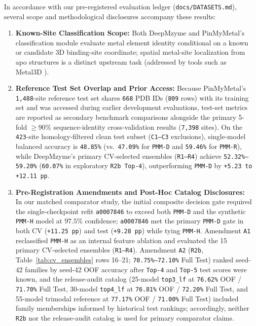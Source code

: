 \documentclass[10pt,a4paper,twocolumn]{article}
\begin{document}
In accordance with our pre-registered evaluation ledger (\texttt{docs/DATASETS.md}), several scope and methodological disclosures accompany these results:
\begin{enumerate}
  \item \textbf{Known-Site Classification Scope:} Both DeepMzyme and PinMyMetal's classification module evaluate metal element identity conditional on a known or candidate 3D binding-site coordinate; spatial metal-site localization from apo structures is a distinct upstream task (addressed by tools such as Metal3D \cite{durr2023metal3d}).
  \item \textbf{Reference Test Set Overlap and Prior Access:} Because PinMyMetal's \texttt{1,488}-site reference test set shares \texttt{668} PDB IDs (\texttt{809} rows) with its training set and was accessed during earlier development evaluations, test-set metrics are reported as secondary benchmark comparisons alongside the primary 5-fold $\ge 90\%$ sequence-identity cross-validation results (\texttt{7,398} sites). On the \texttt{423}-site homology-filtered clean test subset (\texttt{C1--C3} exclusions), single-model balanced accuracy is \texttt{48.85\%} (vs.\ \texttt{47.09\%} for \texttt{PMM-D} and \texttt{59.46\%} for \texttt{PMM-R}), while DeepMzyme's primary CV-selected ensembles (\texttt{R1--R4}) achieve \texttt{52.32\%--59.20\%} (\texttt{60.07\%} in exploratory \texttt{R2b Top-4}), outperforming \texttt{PMM-D} by \texttt{+5.23 to +12.11 pp}.
  \item \textbf{Pre-Registration Amendments and Post-Hoc Catalog Disclosures:} In our matched comparator study, the initial composite decision gate required the single-checkpoint refit \texttt{a0007846} to exceed both \texttt{PMM-D} and the synthetic \texttt{PMM-H} model at $97.5\%$ confidence; \texttt{a0007846} met the primary \texttt{PMM-D} gate in both CV (\texttt{+11.25 pp}) and test (\texttt{+9.28 pp}) while tying \texttt{PMM-H}. Amendment \texttt{A1} reclassified \texttt{PMM-H} as an internal feature ablation and evaluated the 15 primary CV-selected ensembles (\texttt{R1--R4}). Amendment \texttt{A2} (\texttt{R2b}, Table~\ref{tab:cv_ensembles} rows 16--21; \texttt{70.75\%--72.10\%} Full Test) ranked seed-42 families by seed-42 OOF accuracy after \texttt{Top-4} and \texttt{Top-5} test scores were known, and the release-audit catalog (25-model \texttt{top3\_lf} at \texttt{76.62\%} OOF / \texttt{71.70\%} Full Test, 30-model \texttt{top4\_lf} at \texttt{76.81\%} OOF / \texttt{72.20\%} Full Test, and 55-model trimodal reference at \texttt{77.17\%} OOF / \texttt{71.00\%} Full Test) included family memberships informed by historical test rankings; accordingly, neither \texttt{R2b} nor the release-audit catalog is used for primary comparator claims.

\end{enumerate}
\end{document}
